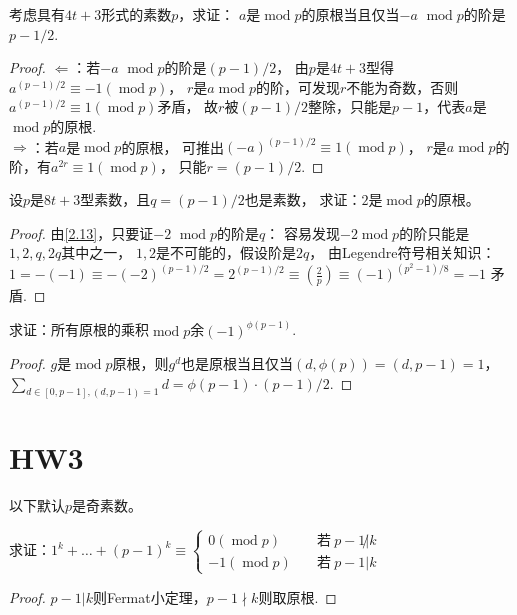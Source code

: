 \begin{exercise}\label{2.13}
    考虑具有$4t+3$形式的素数$p$，求证：
    $a$是$\operatorname{mod}p$的原根当且仅当$-a$ $\operatorname{mod}p$的阶是$p-1/2$.
\end{exercise}
\begin{proof}
    $\Longleftarrow$：若$-a$ $\operatorname{mod}p$的阶是$(p-1)/2$，
    由$p$是$4t+3$型得$a^{(p-1)/2}\equiv-1(\operatorname{mod}p)$，
    $r$是$a$$\operatorname{mod}p$的阶，可发现$r$不能为奇数，否则$a^{(p-1)/2}\equiv1(\operatorname{mod}p)$矛盾，
    故$r$被$(p-1)/2$整除，只能是$p-1$，代表$a$是$\operatorname{mod}p$的原根.\\
    \qquad$\Longrightarrow$：若$a$是$\operatorname{mod}p$的原根，
    可推出$(-a)^{(p-1)/2}\equiv1(\operatorname{mod}p)$，
    $r$是$a$$\operatorname{mod}p$的阶，有$a^{2r}\equiv1(\operatorname{mod}p)$，
    只能$r=(p-1)/2$.
\end{proof}

\begin{exercise}
    设$p$是$8t+3$型素数，且$q=(p-1)/2$也是素数，
    求证：$2$是$\operatorname{mod}p$的原根。
\end{exercise}
\begin{proof}
    由\ref{2.13}，只要证$-2$ $\operatorname{mod}p$的阶是$q$：
    容易发现$-2\operatorname{mod}p$的阶只能是$1,2,q,2q$其中之一，
    $1,2$是不可能的，假设阶是$2q$，
    由Legendre符号相关知识：$1=-(-1)\equiv -(-2)^{(p-1)/2}=2^{(p-1)/2}
    \equiv \left( \frac{2}{p} \right) \equiv (-1)^{(p^2-1)/8}=-1$ 矛盾.
\end{proof}

\begin{exercise}
    求证：所有原根的乘积$\operatorname{mod}p$余$(-1)^{\phi(p-1)}$.
\end{exercise}
\begin{proof}
    $g$是$\operatorname{mod}p$原根，则$g^d$也是原根当且仅当$(d,\phi(p))=(d,p-1)=1$，
$\sum_{d\in[0,p-1],(d,p-1)=1}d=\phi(p-1)\cdot(p-1)/2$.
\end{proof}

\section{HW3}
以下默认$p$是奇素数。
\begin{exercise}
    求证：$1^k+\ldots+(p-1)^k\equiv
    \begin{cases}
        0(\operatorname{mod}p)\quad&若\ p-1\not|k\\
        -1(\operatorname{mod}p)\quad&若\ p-1|k
    \end{cases}$
\end{exercise}
\begin{proof}
    $p-1|k$则Fermat小定理，$p-1\nmid k$则取原根.
\end{proof}

